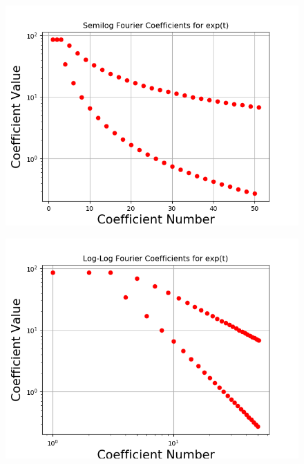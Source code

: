 \documentclass[11pt, a4paper]{article}
\begin{document}
\begin{figure}[!tbh]
   	\centering
   	\includegraphics[scale=0.5]{Figure_31.png}
   	\label{fig:11}
   \end{figure}
\begin{figure}[!tbh]
   	\centering
   	\includegraphics[scale=0.5]{Figure_41.png}
   	\label{fig:21}
   \end{figure}
   
\end{document}
